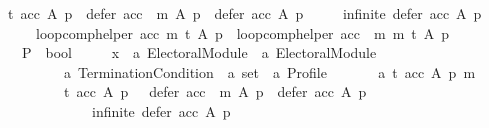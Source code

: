 \begin{isabellebody}
\ \ {\isachardoublequoteopen}{\isasymnot}{\isacharparenleft}{\kern0pt}t\ {\isacharparenleft}{\kern0pt}acc\ A\ p{\isacharparenright}{\kern0pt}\ {\isasymor}\ {\isasymnot}{\isacharparenleft}{\kern0pt}{\isacharparenleft}{\kern0pt}defer\ {\isacharparenleft}{\kern0pt}acc\ {\isasymtriangleright}\ m{\isacharparenright}{\kern0pt}\ A\ p{\isacharparenright}{\kern0pt}\ {\isasymsubset}\ {\isacharparenleft}{\kern0pt}defer\ acc\ A\ p{\isacharparenright}{\kern0pt}{\isacharparenright}{\kern0pt}\ {\isasymor}\isanewline
\ \ \ \ infinite\ {\isacharparenleft}{\kern0pt}defer\ acc\ A\ p{\isacharparenright}{\kern0pt}{\isacharparenright}{\kern0pt}\ {\isasymLongrightarrow}\isanewline
\ \ \ \ \ \ loop{\isacharunderscore}{\kern0pt}comp{\isacharunderscore}{\kern0pt}helper\ acc\ m\ t\ A\ p\ {\isacharequal}{\kern0pt}\ loop{\isacharunderscore}{\kern0pt}comp{\isacharunderscore}{\kern0pt}helper\ {\isacharparenleft}{\kern0pt}acc\ {\isasymtriangleright}\ m{\isacharparenright}{\kern0pt}\ m\ t\ A\ p{\isachardoublequoteclose}\isanewline
%
\isadelimproof
%
\endisadelimproof
%
\isatagproof
{}\isamarkupfalse%
\ {\isacharminus}{\kern0pt}\isanewline
\ \ \isamarkupfalse%
\isanewline
\ \ \ \ P\ {\isacharcolon}{\kern0pt}{\isacharcolon}{\kern0pt}\ bool\ \isanewline
\ \ \ \ x\ {\isacharcolon}{\kern0pt}{\isacharcolon}{\kern0pt}\ {\isachardoublequoteopen}{\isacharparenleft}{\kern0pt}{\isacharprime}{\kern0pt}a\ Electoral{\isacharunderscore}{\kern0pt}Module{\isacharparenright}{\kern0pt}\ {\isasymtimes}\ {\isacharparenleft}{\kern0pt}{\isacharprime}{\kern0pt}a\ Electoral{\isacharunderscore}{\kern0pt}Module{\isacharparenright}{\kern0pt}\ {\isasymtimes}\isanewline
\ \ \ \ \ \ \ \ \ \ {\isacharparenleft}{\kern0pt}{\isacharprime}{\kern0pt}a\ Termination{\isacharunderscore}{\kern0pt}Condition{\isacharparenright}{\kern0pt}\ {\isasymtimes}\ {\isacharprime}{\kern0pt}a\ set\ {\isasymtimes}\ {\isacharprime}{\kern0pt}a\ Profile{\isachardoublequoteclose}\isanewline
\ \ \isamarkupfalse%
\isanewline
\ \ \ \ a{}{\isacharcolon}{\kern0pt}\ {\isachardoublequoteopen}{\isasymAnd}t\ acc\ A\ p\ m{\isachardot}{\kern0pt}\isanewline
\ \ \ \ \ \ \ \ \ \ {\isasymlbrakk}t\ {\isacharparenleft}{\kern0pt}acc\ A\ p{\isacharparenright}{\kern0pt}\ {\isasymor}\ {\isasymnot}\ defer\ {\isacharparenleft}{\kern0pt}acc\ {\isasymtriangleright}\ m{\isacharparenright}{\kern0pt}\ A\ p\ {\isasymsubset}\ defer\ acc\ A\ p\ {\isasymor}\isanewline
\ \ \ \ \ \ \ \ \ \ \ \ \ \ infinite\ {\isacharparenleft}{\kern0pt}defer\ acc\ A\ p{\isacharparenright}{\kern0pt}{\isacharsemicolon}{\kern0pt}\isanewline

\end{isabellebody}
